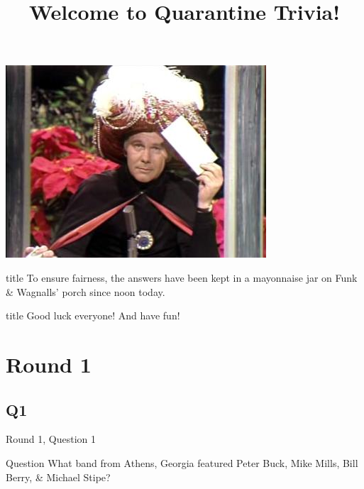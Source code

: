 \documentclass[11pt]{beamer}
\begin{document}
\title{Welcome to Quarantine Trivia!}
\date{}

\begin{frame}
\titlepage{}
\end{frame}

\begingroup{}
\begin{frame}
\vfill{}
\includegraphics[width=0.7\linewidth,scale=0.7]{carson.JPG}
\centering{}
\begin{beamercolorbox}[sep=8pt,center,shadow=true,rounded=true]{title}
To ensure fairness, the answers have been kept in a mayonnaise jar on Funk \& Wagnalls’ porch since noon today.
\end{beamercolorbox}
\vfill{}
\end{frame}
\endgroup{}

\begingroup{}
\begin{frame}
\vfill{}
\begin{beamercolorbox}[sep=8pt,center,shadow=true,rounded=true]{title}
Good luck everyone! And have fun!
\end{beamercolorbox}
\vfill{}
\end{frame}
\endgroup{}
    

\section{Round 1}
    

\subsection*{Q1}
\begin{frame}[t]{Round 1, Question 1}
\vspace{2em}
\begin{block}{Question}
What band from Athens, Georgia featured Peter Buck, Mike Mills, Bill Berry, \& Michael Stipe\@?
\end{block}
\end{frame}
    
\end{document}
